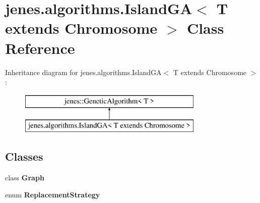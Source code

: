 \hypertarget{classjenes_1_1algorithms_1_1_island_g_a_3_01_t_01extends_01_chromosome_01_4}{\section{jenes.\-algorithms.\-Island\-G\-A$<$ T extends Chromosome $>$ Class Reference}
\label{classjenes_1_1algorithms_1_1_island_g_a_3_01_t_01extends_01_chromosome_01_4}
}
Inheritance diagram for jenes.\-algorithms.\-Island\-G\-A$<$ T extends Chromosome $>$\-:\begin{figure}[H]
\begin{center}
\leavevmode
\includegraphics[height=2.000000cm]{classjenes_1_1algorithms_1_1_island_g_a_3_01_t_01extends_01_chromosome_01_4}
\end{center}
\end{figure}
\subsection*{Classes}
\begin{DoxyCompactItemize}
\item 
class {\bfseries Graph}
\item 
enum {\bfseries Replacement\-Strategy}
\end{DoxyCompactItemize}
